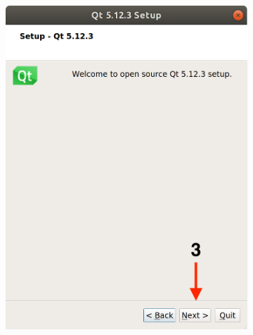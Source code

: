 \begin{figure}[H]
\begin{subfigure}{0.32\linewidth}
        \includegraphics[width=1\textwidth]{images/Qt3.png}
    \end{subfigure}
    \begin{subfigure}{0.32\linewidth}

\end{subfigure}
\end{figure}
